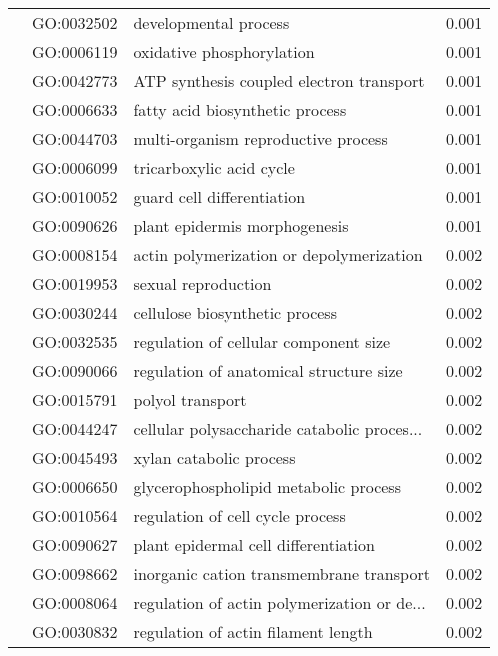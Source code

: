 \begin{longtable}{lllr}
   & GO:0032502 &                        developmental process &         0.001 \\
   & GO:0006119 &                    oxidative phosphorylation &         0.001 \\
   & GO:0042773 &     ATP synthesis coupled electron transport &         0.001 \\
   & GO:0006633 &              fatty acid biosynthetic process &         0.001 \\
   & GO:0044703 &          multi-organism reproductive process &         0.001 \\
   & GO:0006099 &                     tricarboxylic acid cycle &         0.001 \\
   & GO:0010052 &                   guard cell differentiation &         0.001 \\
   & GO:0090626 &                plant epidermis morphogenesis &         0.001 \\
   & GO:0008154 &     actin polymerization or depolymerization &         0.002 \\
   & GO:0019953 &                          sexual reproduction &         0.002 \\
   & GO:0030244 &               cellulose biosynthetic process &         0.002 \\
   & GO:0032535 &        regulation of cellular component size &         0.002 \\
   & GO:0090066 &      regulation of anatomical structure size &         0.002 \\
   & GO:0015791 &                             polyol transport &         0.002 \\
   & GO:0044247 &  cellular polysaccharide catabolic proces... &         0.002 \\
   & GO:0045493 &                      xylan catabolic process &         0.002 \\
   & GO:0006650 &        glycerophospholipid metabolic process &         0.002 \\
   & GO:0010564 &             regulation of cell cycle process &         0.002 \\
   & GO:0090627 &         plant epidermal cell differentiation &         0.002 \\
   & GO:0098662 &     inorganic cation transmembrane transport &         0.002 \\
   & GO:0008064 &  regulation of actin polymerization or de... &         0.002 \\
   & GO:0030832 &          regulation of actin filament length &         0.002 \\

\end{longtable}
